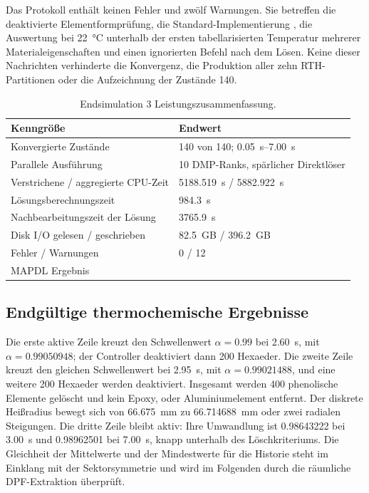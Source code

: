 \documentclass[oneside,openany]{amsdtx}
\begin{document}
Das Protokoll enthält keinen Fehler und zwölf Warnungen. Sie betreffen die deaktivierte Elementformprüfung, die Standard-Implementierung , die Auswertung bei \SI{22}{\celsius} unterhalb der ersten tabellarisierten Temperatur mehrerer Materialeigenschaften und einen ignorierten Befehl  nach dem Lösen. Keine dieser Nachrichten verhinderte die Konvergenz, die Produktion aller zehn RTH-Partitionen oder die Aufzeichnung der Zustände 140.

\begin{table}[H]
\centering
\small
\renewcommand{\arraystretch}{1.15}
\begin{tabular}{L{0.49\textwidth}L{0.37\textwidth}}
\toprule
\textbf{Kenngröße} & \textbf{Endwert} \\
\midrule
Konvergierte Zustände & 140 von 140; \SIrange{0.05}{7.00}{s} \\
Parallele Ausführung & 10 DMP-Ranks, spärlicher Direktlöser \\
Verstrichene / aggregierte CPU-Zeit & \SI{5188.519}{s} / \SI{5882.922}{s} \\
Lösungsberechnungszeit & \SI{984.3}{s} \\
Nachbearbeitungszeit der Lösung & \SI{3765.9}{s} \\
Disk I/O gelesen / geschrieben & \SI{82.5}{GB} / \SI{396.2}{GB} \\
Fehler / Warnungen & 0 / 12 \\
MAPDL Ergebnis &  \\
\bottomrule
\end{tabular}
\caption{Endsimulation 3 Leistungszusammenfassung.}
\label{tab:sim3-performance}
\end{table}

\subsection{Endgültige thermochemische Ergebnisse}

Die erste aktive Zeile kreuzt den Schwellenwert \(\alpha=0.99\) bei \SI{2.60}{s}, mit \(\alpha=0.99050948\); der Controller deaktiviert dann 200  Hexaeder. Die zweite Zeile kreuzt den gleichen Schwellenwert bei \SI{2.95}{s}, mit \(\alpha=0.99021488\), und eine weitere 200 Hexaeder werden deaktiviert. Insgesamt werden 400 phenolische Elemente gelöscht und kein Epoxy,  oder Aluminiumelement entfernt. Der diskrete Heißradius bewegt sich von \SI{66.675}{mm} zu \SI{66.714688}{mm} oder zwei radialen Steigungen. Die dritte Zeile bleibt aktiv: Ihre Umwandlung ist 0.98643222 bei \SI{3.00}{s} und 0.98962501 bei \SI{7.00}{s}, knapp unterhalb des Löschkriteriums. Die Gleichheit der Mittelwerte und der Mindestwerte für die Historie steht im Einklang mit der Sektorsymmetrie und wird im Folgenden durch die räumliche DPF-Extraktion überprüft.
\end{document}
